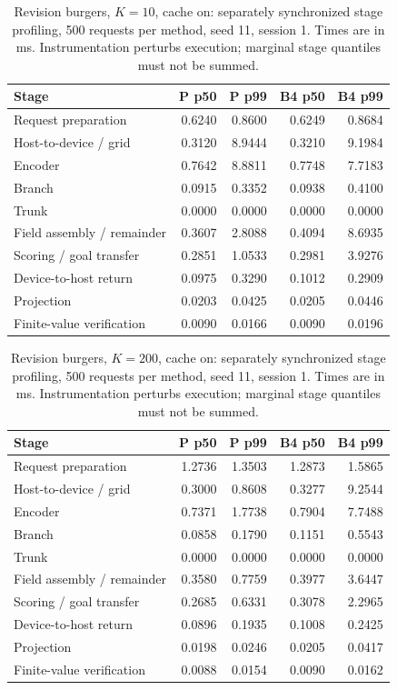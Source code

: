 \begin{table}[ht]
\centering\small
\caption{Revision burgers, $K=10$, cache on: separately synchronized stage profiling, 500 requests per method, seed 11, session 1. Times are in ms. Instrumentation perturbs execution; marginal stage quantiles must not be summed.}\label{tab:e2_profile_burgers_10_on}
\begin{tabular}{@{}lrrrr@{}}\toprule
Stage & P p50 & P p99 & B4 p50 & B4 p99\\\midrule
Request preparation & 0.6240 & 0.8600 & 0.6249 & 0.8684\\
Host-to-device / grid & 0.3120 & 8.9444 & 0.3210 & 9.1984\\
Encoder & 0.7642 & 8.8811 & 0.7748 & 7.7183\\
Branch & 0.0915 & 0.3352 & 0.0938 & 0.4100\\
Trunk & 0.0000 & 0.0000 & 0.0000 & 0.0000\\
Field assembly / remainder & 0.3607 & 2.8088 & 0.4094 & 8.6935\\
Scoring / goal transfer & 0.2851 & 1.0533 & 0.2981 & 3.9276\\
Device-to-host return & 0.0975 & 0.3290 & 0.1012 & 0.2909\\
Projection & 0.0203 & 0.0425 & 0.0205 & 0.0446\\
Finite-value verification & 0.0090 & 0.0166 & 0.0090 & 0.0196\\
\bottomrule\end{tabular}
\end{table}

\begin{table}[ht]
\centering\small
\caption{Revision burgers, $K=200$, cache on: separately synchronized stage profiling, 500 requests per method, seed 11, session 1. Times are in ms. Instrumentation perturbs execution; marginal stage quantiles must not be summed.}\label{tab:e2_profile_burgers_200_on}
\begin{tabular}{@{}lrrrr@{}}\toprule
Stage & P p50 & P p99 & B4 p50 & B4 p99\\\midrule
Request preparation & 1.2736 & 1.3503 & 1.2873 & 1.5865\\
Host-to-device / grid & 0.3000 & 0.8608 & 0.3277 & 9.2544\\
Encoder & 0.7371 & 1.7738 & 0.7904 & 7.7488\\
Branch & 0.0858 & 0.1790 & 0.1151 & 0.5543\\
Trunk & 0.0000 & 0.0000 & 0.0000 & 0.0000\\
Field assembly / remainder & 0.3580 & 0.7759 & 0.3977 & 3.6447\\
Scoring / goal transfer & 0.2685 & 0.6331 & 0.3078 & 2.2965\\
Device-to-host return & 0.0896 & 0.1935 & 0.1008 & 0.2425\\
Projection & 0.0198 & 0.0246 & 0.0205 & 0.0417\\
Finite-value verification & 0.0088 & 0.0154 & 0.0090 & 0.0162\\
\bottomrule\end{tabular}
\end{table}

